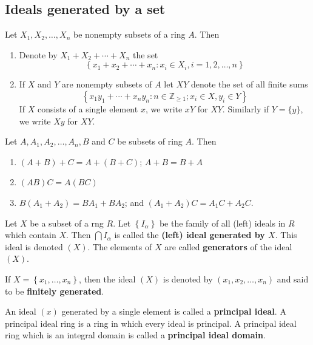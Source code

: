 \subsection{Ideals generated by a set}
\begin{definition}
    Let $X_1, X_2, \ldots, X_n$ be nonempty subsets of a ring $A$.
    Then
    \begin{enumerate}
        \item
              Denote by $X_1+X_2+\cdots+X_n$ the set
              \begin{equation*}
                  \left\{x_1+x_2+\cdots+x_n : x_i \in X_i, i=1,2, \ldots, n\right\}
              \end{equation*}

        \item
              If $X$ and $Y$ are nonempty subsets of $A$ let $X Y$ denote the set of all finite sums
              \begin{equation*}
                  \left\{x_1 y_1+\cdots+x_n y_n : n \in \mathbb{Z}_{\geq 1} ; x_i \in X , y_i \in Y \right\}
              \end{equation*}
              If $X$ consists of a single element $x$, we write $x Y$ for $X Y$. Similarly if $Y=\{y\}$, we write $X y$ for $X Y$.
    \end{enumerate}
\end{definition}

\begin{theorem}
    Let $A, A_1, A_2, \ldots, A_{{n}}, {B}$ and $C$ be subsets of ring $A$.
    Then
    \begin{enumerate}
        \item  $(A+{B})+{C}=A+({B}+{C})$; $A+B=B+A$

        \item $(AB) {C}=A(BC)$

        \item ${B}\left(A_1+A_2\right)={BA}_1+{BA}_2$; and $\left(A_1+A_2\right) {C}=A_1 {C}+A_2 {C}$.
    \end{enumerate}
\end{theorem}

\begin{definition}
    Let $X$ be a subset of a rng $R$. Let $\left\{I_\alpha \right\}$ be the family of all (left) ideals in $R$ which contain $X$.
    Then $\bigcap I_\alpha $ is called the \textbf{(left) ideal generated by $X$}. This ideal is denoted $(X)$. The elements of $X$ are called \textbf{generators} of the ideal $(X)$.

    If $X=\left\{x_1, \ldots, x_n\right\}$, then the ideal $(X)$ is denoted by $\left(x_1, x_2, \ldots, x_n\right)$ and said to be \textbf{finitely generated}.

    An ideal $(x)$  generated by a single element is called a \textbf{principal ideal}. A principal ideal ring is a ring in which every ideal is principal. A principal ideal ring which is an integral domain is called a \textbf{principal ideal domain}.
\end{definition}

